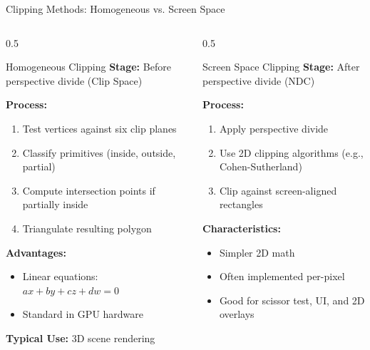\begin{frame}{Clipping Methods: Homogeneous vs. Screen Space}
  \scriptsize
  \begin{columns}
    \begin{column}{0.5\textwidth}
      \begin{raybox}{Homogeneous Clipping}
        \textbf{Stage:} Before perspective divide (Clip Space)

        \vspace{0.2cm}
        \textbf{Process:}
        \begin{enumerate}
          \item Test vertices against six clip planes
          \item Classify primitives (inside, outside, partial)
          \item Compute intersection points if partially inside
          \item Triangulate resulting polygon
        \end{enumerate}

        \vspace{0.2cm}
        \textbf{Advantages:}
        \begin{itemize}
          \item Linear equations: $ax + by + cz + dw = 0$
          \item Standard in GPU hardware
        \end{itemize}

        \vspace{0.2cm}
        \textbf{Typical Use:} 3D scene rendering
      \end{raybox}
    \end{column}

    \begin{column}{0.5\textwidth}
      \begin{conceptbox}{Screen Space Clipping}
        \textbf{Stage:} After perspective divide (NDC)

        \vspace{0.2cm}
        \textbf{Process:}
        \begin{enumerate}
          \item Apply perspective divide
          \item Use 2D clipping algorithms (e.g., Cohen-Sutherland)
          \item Clip against screen-aligned rectangles
        \end{enumerate}

        \vspace{0.2cm}
        \textbf{Characteristics:}
        \begin{itemize}
          \item Simpler 2D math
          \item Often implemented per-pixel
          \item Good for scissor test, UI, and 2D overlays
        \end{itemize}


\end{conceptbox}
\end{column}
\end{columns}
\end{frame}
